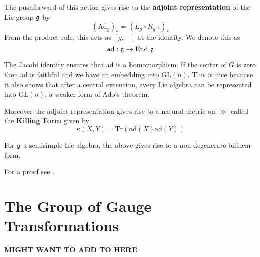 		\begin{defn}
			The pushforward of this action gives rise to the \textbf{adjoint representation} of the Lie group $\frak g$ by
			\begin{equation}
				(\mathrm{Ad}_g)_* = (L_g \circ R_{g^{-1}})_* 
			\end{equation}
			From the product rule, this acts as $[g, -]$ at the identity. We denote this as
			\begin{equation}
				\mathrm{ad}: \frak g \rightarrow \mathrm{End}~ \frak g
			\end{equation}
		\end{defn}
		
		The Jacobi identity ensures that $\mathrm{ad}$ is a homomorphism. If the center of $G$ is zero then $\mathrm{ad}$ is faithful and we have an embedding into $\mathrm{GL}(n)$. This is nice because it also shows that after a central extension, every Lie algebra can be represented into $\mathrm{GL}(n)$, a weaker form of Ado's theorem.
		
		Moreover the adjoint representation gives rise to a natural metric on $\gg$ called the \textbf{Killing Form} given by
		\begin{equation}
			\kappa (X, Y) = \mathrm{Tr}(\mathrm{ad}(X) \mathrm{ad}(Y))
		\end{equation}
		
		\begin{prop}
			For $\frak g$ a semisimple Lie algebra, the above gives rise to a non-degenerate bilinear form. 
		\end{prop}
		For a proof see \cite{humphreys2012}.
		
		\section{The Group of Gauge Transformations}
		
		\textbf{MIGHT WANT TO ADD TO HERE}
		
